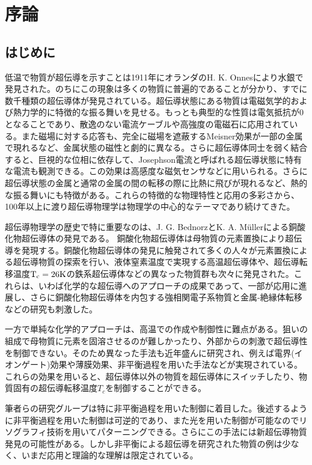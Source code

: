 \section{序論}
\subsection{はじめに}
低温で物質が超伝導を示すことは1911年にオランダのH. K. Onnesにより水銀で発見された。のちにこの現象は多くの物質に普遍的であることが分かり、すでに数千種類の超伝導体が発見されている。超伝導状態にある物質は電磁気学的および熱力学的に特徴的な振る舞いを見せる。もっとも典型的な性質は電気抵抗が0となることであり、散逸のない電流ケーブルや高強度の電磁石に応用されている。また磁場に対する応答も、完全に磁場を遮蔽するMeisner効果が一部の金属で現れるなど、金属状態の磁性と劇的に異なる。さらに超伝導体同士を弱く結合すると、巨視的な位相に依存して、Josephson電流と呼ばれる超伝導状態に特有な電流も観測できる。この効果は高感度な磁気センサなどに用いられる。さらに超伝導状態の金属と通常の金属の間の転移の際に比熱に飛びが現れるなど、熱的な振る舞いにも特徴がある。これらの特徴的な物理特性と応用の多彩さから、100年以上に渡り超伝導物理学は物理学の中心的なテーマであり続けてきた。

超伝導物理学の歴史で特に重要なのは、J. G. BednorzとK. A. M\"ullerによる銅酸化物超伝導体の発見である\cite{Bednorz}。
銅酸化物超伝導体は母物質の元素置換により超伝導を発現する\cite{Lee2006}。銅酸化物超伝導体の発見に触発されて多くの人々が元素置換による超伝導物質の探索を行い、液体窒素温度で実現する高温超伝導体\cite{Wu}や、超伝導転移温度$\rm T_c=26K$の鉄系超伝導体\cite{Kamihara}などの異なった物質群も次々に発見された。これらは、いわば化学的な超伝導へのアプローチの成果であって、一部が応用に進展し、さらに銅酸化物超伝導体を内包する強相関電子系物質と金属-絶縁体転移などの研究も刺激した\cite{Lee2006,Imada}。

一方で単純な化学的アプローチは、高温での作成や制御性に難点がある。狙いの組成で母物質に元素を固溶させるのが難しかったり、外部からの刺激で超伝導性を制御できない。そのため異なった手法も近年盛んに研究され、例えば電界(イオンゲート)効果\cite{Ueno,Ueno2,Ye2009}や薄膜効果\cite{Chiang1900}、非平衡過程\cite{Fausti,Hunt2015,Mitrano2016,oike}を用いた手法などが実現されている。これらの効果を用いると、超伝導体以外の物質を超伝導体にスイッチしたり、物質固有の超伝導転移温度$T_c$を制御することができる。

筆者らの研究グループは特に非平衡過程を用いた制御に着目した。後述するように非平衡過程を用いた制御は可逆的であり、また光を用いた制御が可能なのでリソグラフィ技術を用いてパターニングできる。さらにこの手法には新超伝導物質発見の可能性がある。しかし非平衡による超伝導を研究された物質の例は少なく、いまだ応用と理論的な理解は限定されている。

